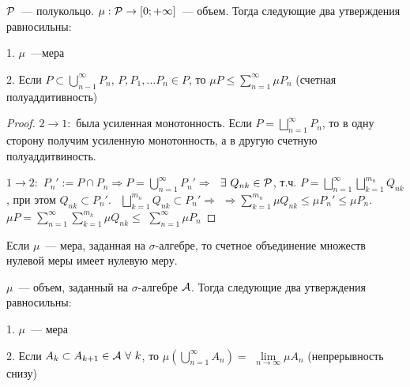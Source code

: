    \begin{theorem}
       $\P$~--- полукольцо. 
       $\mu : \P \to [0; +\infty]$~--- объем. Тогда следующие два утверждения равносильны:
   
       1. $\mu$~---мера
   
       2. Если $P \subset \bigcup \limits_{n - 1}^{\infty} P_n$, $P, P_1, \ldots P_n \in P$, 
       то $\mu P \le \sum \limits_{n=1}^{\infty} \mu P_n$ (счетная полуаддитивность)
   \end{theorem}
   
   \begin{proof}
       $2 \to 1:$ была усиленная монотонность. Если $P = \bigsqcup \limits_{n = 1}^{\infty} P_n$, 
       то в одну сторону получим усиленную монотонность, а в другую счетную полуаддитвиность.
   
       $1 \to 2:$ $P_n' := P \cap P_n \Rightarrow P = \bigcup \limits_{n = 1}^{\infty} P_n' \Rightarrow$
       $\ \exists \ Q_{nk} \in \P$, т.ч. $P = \bigsqcup \limits_{n = 1}^{\infty}  \bigsqcup \limits_{k = 1}^{m_n} Q_{nk}$, 
       при этом $Q_{nk} \subset P_n'$. \ $\bigsqcup \limits_{k = 1}^{m_n} Q_{nk} \subset P_n' \Rightarrow$ 
       $\Rightarrow \sum \limits_{k=1}^{m_n} \mu Q_{nk} \le \mu P_n' \le \mu P_n$. \
       $\mu P = \sum \limits_{n=1}^{\infty} \sum \limits_{k=1}^{m_k} \mu Q_{nk} \le $
       $\sum \limits_{n=1}^{\infty} \mu P_n$
   \end{proof}
   
   \begin{consequence}
       Если $\mu$~--- мера, заданная на $\sigma$-алгебре, то счетное объединение множеств нулевой меры имеет нулевую меру.
   \end{consequence}
   
   
   \begin{theorem}
       $\mu$~--- объем, заданный на $\sigma$-алгебре $\A$. Тогда следующие два утверждения равносильны:
   
       1. $\mu$~--- мера
   
       2. Если $A_k \subset A_{k + 1} \in \A \ \forall \ k$, то $\mu \left ( \bigcup \limits_{n = 1}^{\infty} A_n \right ) = $
       $\lim \limits_{n \to \infty} \mu A_n$ (непрерывность снизу)
   \end{theorem}
   
